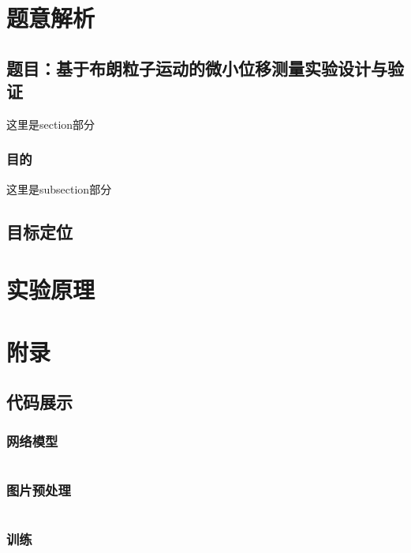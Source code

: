 \documentclass[a4paper]{report}
\begin{document}
\tableofcontents
\chapter{题意解析}

\section{题目：基于布朗粒子运动的微小位移测量实验设计与验证}
这里是section部分
\subsection{目的}
这里是subsection部分

\section{目标定位}

\chapter{实验原理}

\chapter{附录}
\section{代码展示}
\subsection{网络模型}
\begin{lstlisting}[language=Python, caption=生成器, label=code:generator]

\end{lstlisting}
\subsection{图片预处理}
\begin{lstlisting}[language=Python, caption=图片处理, label=code:discriminator]

\end{lstlisting}
\subsection{训练}
\begin{lstlisting}[language=Python, caption=训练, label=code:discriminator]

\end{lstlisting}
\end{document}
